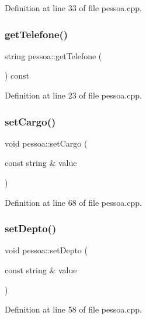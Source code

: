 Definition at line 33 of file pessoa.\+cpp.

\hypertarget{classpessoa_a248cbdf67320b616ba15c323dea16bb5}{}\label{classpessoa_a248cbdf67320b616ba15c323dea16bb5} 
\subsubsection{\texorpdfstring{get\+Telefone()}{getTelefone()}}
{\footnotesize\ttfamily string pessoa\+::get\+Telefone (\begin{DoxyParamCaption}{ }\end{DoxyParamCaption}) const}



Definition at line 23 of file pessoa.\+cpp.

\hypertarget{classpessoa_a9fd52a51b1f987c28aa8016899beb892}{}\label{classpessoa_a9fd52a51b1f987c28aa8016899beb892} 
\subsubsection{\texorpdfstring{set\+Cargo()}{setCargo()}}
{\footnotesize\ttfamily void pessoa\+::set\+Cargo (\begin{DoxyParamCaption}\item[{const string \&}]{value }\end{DoxyParamCaption})}



Definition at line 68 of file pessoa.\+cpp.

\hypertarget{classpessoa_ae71cc4caf660b5ffc4f9bedc5b4d9d79}{}\label{classpessoa_ae71cc4caf660b5ffc4f9bedc5b4d9d79} 
\subsubsection{\texorpdfstring{set\+Depto()}{setDepto()}}
{\footnotesize\ttfamily void pessoa\+::set\+Depto (\begin{DoxyParamCaption}\item[{const string \&}]{value }\end{DoxyParamCaption})}



Definition at line 58 of file pessoa.\+cpp.

\hypertarget{classpessoa_ab5f43c9f7ab0b72df2758d4d1da92a63}{}\label{classpessoa_ab5f43c9f7ab0b72df2758d4d1da92a63} 
